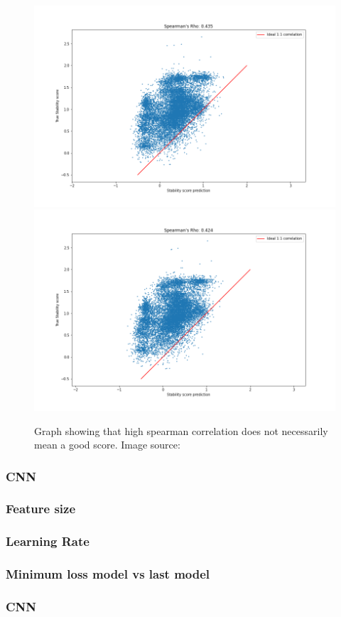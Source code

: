 \begin{figure}[!ht]
  \centering
  \includegraphics[width=0.4\linewidth]{latex/imgs/spearman_1_layer_with_schedule_256_final.png}
  \includegraphics[width=0.4\linewidth]{latex/imgs/spearman_1_layer_with_schedule_256_minloss.png}
  \caption{Graph showing that high spearman correlation does not necessarily mean a good score. Image source:\cite{spearman}}
\end{figure}
\newpage
\subsubsection{CNN}


\subsubsection{Feature size}


\subsubsection{Learning Rate}


\subsubsection{Minimum loss model vs last model} %


\subsubsection{CNN}

